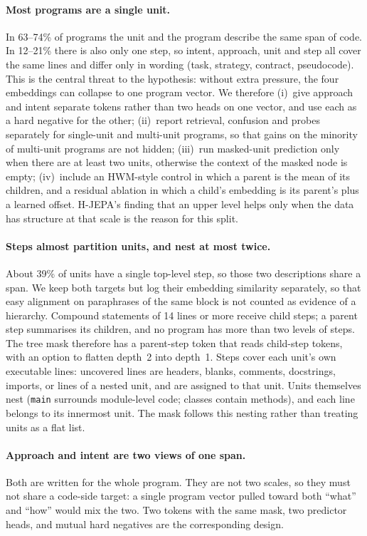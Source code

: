 \documentclass[11pt]{article}
\begin{document}
\paragraph{Most programs are a single unit.}
In 63--74\% of programs the unit and the program describe the same span of code. In 12--21\% there is also only one
step, so intent, approach, unit and step all cover the same lines and differ only in wording (task, strategy,
contract, pseudocode). This is the central threat to the hypothesis: without extra pressure, the four embeddings can
collapse to one program vector. We therefore (i)~give approach and intent separate tokens rather than two heads on
one vector, and use each as a hard negative for the other; (ii)~report retrieval, confusion and probes separately
for single-unit and multi-unit programs, so that gains on the minority of multi-unit programs are not hidden;
(iii)~run masked-unit prediction only when there are at least two units, otherwise the context of the masked node
is empty; (iv)~include an HWM-style control in which a parent is the mean of its children, and a residual ablation
in which a child's embedding is its parent's plus a learned offset. H-JEPA's finding that an upper level helps only
when the data has structure at that scale \citep{zhang2026hjepa} is the reason for this split.

\paragraph{Steps almost partition units, and nest at most twice.}
About 39\% of units have a single top-level step, so those two descriptions share a span. We keep both targets but
log their embedding similarity separately, so that easy alignment on paraphrases of the same block is not counted as
evidence of a hierarchy. Compound statements of 14 lines or more receive child steps; a parent step summarises its
children, and no program has more than two levels of steps. The tree mask therefore has a parent-step token that
reads child-step tokens, with an option to flatten depth~2 into depth~1. Steps cover each unit's own executable
lines: uncovered lines are headers, blanks, comments, docstrings, imports, or lines of a nested unit, and are
assigned to that unit. Units themselves nest (\texttt{main} surrounds module-level code; classes contain methods),
and each line belongs to its innermost unit. The mask follows this nesting rather than treating units as a flat list.

\paragraph{Approach and intent are two views of one span.}
Both are written for the whole program. They are not two scales, so they must not share a code-side target: a single
program vector pulled toward both ``what'' and ``how'' would mix the two. Two tokens with the same mask, two
predictor heads, and mutual hard negatives are the corresponding design.
\end{document}
